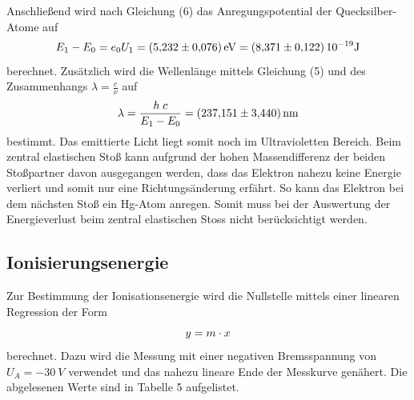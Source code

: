Anschließend wird nach Gleichung (6) das Anregungspotential der Quecksilber-Atome auf
\begin{equation}
  E_1 - E_0 = e_0 U_1 = \SI{5.232 \pm 0.076}{eV} = \SI{8.371 \pm 0.122}{10^{-19} J} \notag
\end{equation}
berechnet.
Zusätzlich wird die Wellenlänge mittels Gleichung (5) und des Zusammenhangs $\lambda = \frac{c}{\nu}$ auf
\begin{equation}
  \lambda = \frac{h \; c}{E_1-E_0} = \SI{237.151 \pm 3.440}{nm} \notag
\end{equation}
bestimmt.
Das emittierte Licht liegt somit noch im Ultravioletten Bereich.
Beim zentral elastischen Sto\ss{} kann aufgrund der hohen Massendifferenz der beiden Stoßpartner davon ausgegangen werden, dass das Elektron nahezu keine Energie verliert und somit nur eine Richtungsänderung erfährt.
So kann das Elektron bei dem nächsten Sto\ss{} ein Hg-Atom anregen.
Somit muss bei der Auswertung der Energieverlust beim zentral elastischen Stoss{} nicht berücksichtigt werden.

\subsection{Ionisierungsenergie}
Zur Bestimmung der Ionisationsenergie wird die Nullstelle mittels einer linearen Regression der Form
\begin{equation}
  y = m \cdot x \notag
\end{equation}
berechnet.
Dazu wird die Messung mit einer negativen Bremsspannung von $U_A = \SI{-30}{V}$ verwendet und das nahezu lineare Ende der Messkurve genähert.
Die abgelesenen Werte sind in Tabelle 5 aufgelistet.

